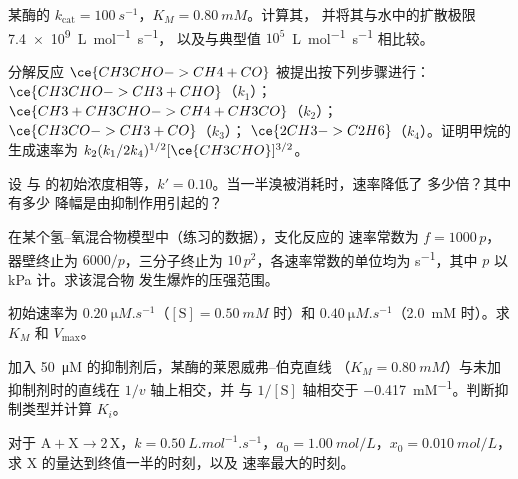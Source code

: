 \begin{exercise}[$\star$]\label{exo:b3:complex-kinetics:4}
某酶的 $k_{\mathrm{cat}} = \qty{100}{s^{-1}}$，$K_M = \qty{0.80}{mM}$。计算其，
并将其与水中的扩散极限 \qty{7.4e9}{L.mol^{-1}.s^{-1}}，
以及与典型值 $10^5$~\unit{L.mol^{-1}.s^{-1}} 相比较。
\end{exercise}

\begin{exercise}[$\star\star$]\label{exo:b3:complex-kinetics:5}
分解反应 $\ce{CH3CHO -> CH4 + CO}$ 被提出按下列步骤进行：$\ce{CH3CHO -> CH3 +
CHO}$（$k_1$）；$\ce{CH3 + CH3CHO -> CH4 + CH3CO}$（$k_2$）；$\ce{CH3CO -> CH3 + CO}$（$k_3$）；
$\ce{2 CH3 -> C2H6}$（$k_4$）。证明甲烷的生成速率为
$k_2(k_1/2k_4)^{1/2}[\ce{CH3CHO}]^{3/2}$。
\end{exercise}

\begin{exercise}[$\star\star$]\label{exo:b3:complex-kinetics:6}
设  与  的初始浓度相等，$k' = 0.10$。当一半溴被消耗时，速率降低了
多少倍？其中有多少
降幅是由抑制作用引起的？
\end{exercise}

\begin{exercise}[$\star\star$]\label{exo:b3:complex-kinetics:7}
在某个氢–氧混合物模型中（练习的数据），支化反应的
速率常数为 $f = 1000\,p$，器壁终止为 $6000/p$，三分子终止为
$10\,p^2$，各速率常数的单位均为 \unit{s^{-1}}，其中 $p$ 以 kPa 计。求该混合物
发生爆炸的压强范围。
\end{exercise}

\begin{exercise}[$\star\star$]\label{exo:b3:complex-kinetics:8}
初始速率为 $\qty{0.20}{\micro M.s^{-1}}$（$[\mathrm S] = \qty{0.50}{mM}$ 时）和
$\qty{0.40}{\micro M.s^{-1}}$（\qty{2.0}{mM} 时）。求 $K_M$ 和 $V_{\max}$。
\end{exercise}

\begin{exercise}[$\star\star$]\label{exo:b3:complex-kinetics:9}
加入 \qty{50}{\micro M} 的抑制剂后，某酶的莱恩威弗–伯克直线
（$K_M = \qty{0.80}{mM}$）与未加抑制剂时的直线在 $1/v$ 轴上相交，并
与 $1/[\mathrm S]$ 轴相交于 \qty{-0.417}{mM^{-1}}。判断抑制类型并计算 $K_i$。
\end{exercise}

\begin{exercise}[$\star\star\star$]\label{exo:b3:complex-kinetics:10}
对于 $\mathrm{A + X \to 2\,X}$，$k = \qty{0.50}{L.mol^{-1}.s^{-1}}$，$a_0 = \qty{1.00}{mol/L}$，$x_0 = \qty{0.010}{mol/L}$，
求 X 的量达到终值一半的时刻，以及
速率最大的时刻。
\end{exercise}

